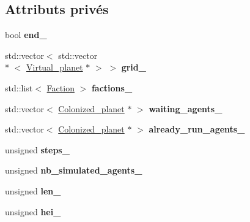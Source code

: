 \subsection*{Attributs privés}
\begin{DoxyCompactItemize}
\item 
\hypertarget{classWorld_a5773dad1dda0f5380a5f65c94f57de9c}{bool {\bfseries end\-\_\-}}\label{classWorld_a5773dad1dda0f5380a5f65c94f57de9c}

\item 
\hypertarget{classWorld_a46afecbf41a86494f6e48dad3d4a3247}{std\-::vector$<$ std\-::vector\\*
$<$ \hyperlink{classVirtual__planet}{Virtual\-\_\-planet} $\ast$ $>$ $>$ {\bfseries grid\-\_\-}}\label{classWorld_a46afecbf41a86494f6e48dad3d4a3247}

\item 
\hypertarget{classWorld_a9e4a76505c85cae1329f6083011e9be5}{std\-::list$<$ \hyperlink{classFaction}{Faction} $>$ {\bfseries factions\-\_\-}}\label{classWorld_a9e4a76505c85cae1329f6083011e9be5}

\item 
\hypertarget{classWorld_a732ce05c7e0012b98e2a8715b41d89fd}{std\-::vector$<$ \hyperlink{classColonized__planet}{Colonized\-\_\-planet} $\ast$ $>$ {\bfseries waiting\-\_\-agents\-\_\-}}\label{classWorld_a732ce05c7e0012b98e2a8715b41d89fd}

\item 
\hypertarget{classWorld_aafbe82365fac0f0d0e98c95d33a258f9}{std\-::vector$<$ \hyperlink{classColonized__planet}{Colonized\-\_\-planet} $\ast$ $>$ {\bfseries already\-\_\-run\-\_\-agents\-\_\-}}\label{classWorld_aafbe82365fac0f0d0e98c95d33a258f9}

\item 
\hypertarget{classWorld_a747132820aba737926418d482571d7d3}{unsigned {\bfseries steps\-\_\-}}\label{classWorld_a747132820aba737926418d482571d7d3}

\item 
\hypertarget{classWorld_a171ee3cda37e3f0d643407d7f5e22a4e}{unsigned {\bfseries nb\-\_\-simulated\-\_\-agents\-\_\-}}\label{classWorld_a171ee3cda37e3f0d643407d7f5e22a4e}

\item 
\hypertarget{classWorld_a37b008437fd73a5d4d6851a88ba61167}{unsigned {\bfseries len\-\_\-}}\label{classWorld_a37b008437fd73a5d4d6851a88ba61167}

\item 
\hypertarget{classWorld_a988746f4879237d7740e52fa36b16555}{unsigned {\bfseries hei\-\_\-}}\label{classWorld_a988746f4879237d7740e52fa36b16555}

\end{DoxyCompactItemize}
